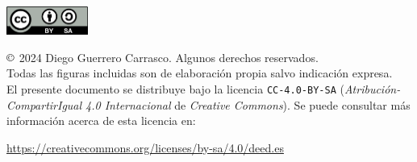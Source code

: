 \vspace*{\fill}

\begin{center}
    \includegraphics[width=0.2\textwidth]{imagenes/utilizadas/0-inicio/cc-40-by-sa.png}
\end{center}

\noindent $\copyright$ 2024 Diego Guerrero Carrasco. Algunos derechos reservados.\\
\noindent Todas las figuras incluidas son de elaboración propia salvo indicación expresa.\\
\noindent El presente documento se distribuye bajo la licencia \texttt{CC-4.0-BY-SA} (\textit{Atribución-CompartirIgual 4.0 Internacional} de \textit{Creative Commons}). Se puede consultar más información acerca de esta licencia en:
\begin{center}
    \href{https://creativecommons.org/licenses/by-sa/4.0/deed.es}{https://creativecommons.org/licenses/by-sa/4.0/deed.es}
\end{center}
